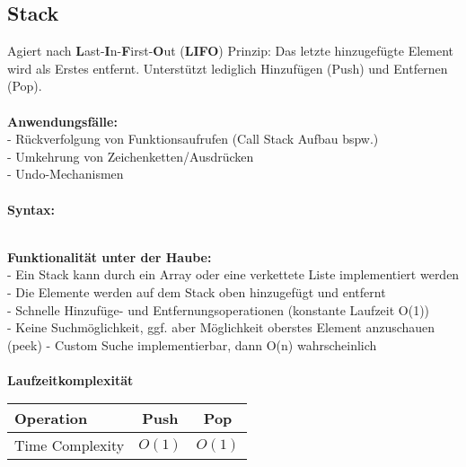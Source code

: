 \documentclass[../main.tex]{subfiles}
\begin{document}
	\subsection{Stack}
	Agiert nach \textbf{L}ast-\textbf{I}n-\textbf{F}irst-\textbf{O}ut (\textbf{LIFO}) Prinzip: Das letzte hinzugefügte Element wird als Erstes entfernt.
	Unterstützt lediglich Hinzufügen (Push) und Entfernen (Pop). \\\\
	\textbf{Anwendungsfälle:}\\
	- Rückverfolgung von Funktionsaufrufen (Call Stack Aufbau bspw.)\\
	- Umkehrung von Zeichenketten/Ausdrücken\\
	- Undo-Mechanismen\\\\
	\textbf{Syntax:}
	 
	\\
	\textbf{Funktionalität unter der Haube:}\\
	- Ein Stack kann durch ein Array oder eine verkettete Liste implementiert werden\\
	- Die Elemente werden auf dem Stack oben hinzugefügt und entfernt\\
	- Schnelle Hinzufüge- und Entfernungsoperationen (konstante Laufzeit O(1))\\
	- Keine Suchmöglichkeit, ggf. aber Möglichkeit oberstes Element anzuschauen (peek)
	- Custom Suche implementierbar, dann O(n) wahrscheinlich\\\\
	\textbf{Laufzeitkomplexität}\\
	\begin{table}[ht]
		\centering
		\begin{tabular}{l *{2}{c}}
			\toprule
			Operation & Push & Pop  \\
			\midrule
			Time Complexity & $O(1)$ & $O(1)$\\
			\bottomrule
		\end{tabular}
	\end{table}
	\clearpage
\end{document}
